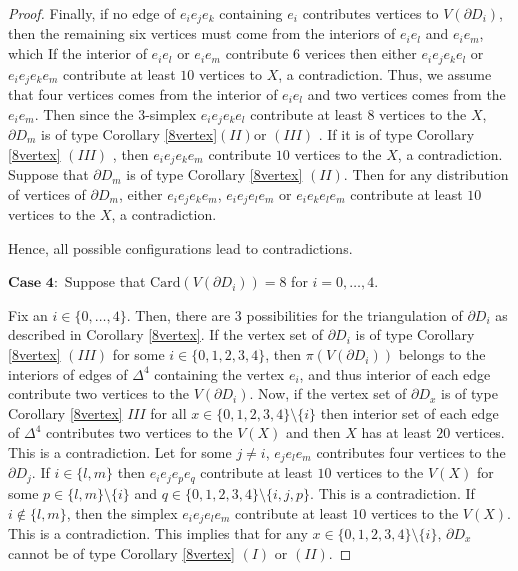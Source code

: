 \documentclass[10pt,a4paper]{amsart}
\newcommand{\D}{\Delta}
\begin{document}
\begin{proof}
Finally, if no edge of $e_i e_j e_k$ containing $e_i$ contributes vertices to $V(\partial D_i)$, then the remaining six vertices must come from the interiors of $e_i e_l$ and $e_i e_m$, which 
If the interior of $e_ie_l$ or $e_ie_m$ contribute $6$ verices then either $e_ie_je_ke_l$ or $e_ie_je_ke_m$ contribute at least $10$ vertices to $X$, a contradiction. Thus, we assume that four vertices comes from the interior of $e_ie_l$ and two vertices comes from the $e_ie_m$. Then since the $3$-simplex $e_ie_je_ke_l$ contribute at least  $8$ vertices to the $X$, $\partial D_m$ is of type Corollary \ref{8vertex}$(II)$or $(III)$ . If it is of type Corollary \ref{8vertex} $(III)$ , then $e_ie_je_ke_m$ contribute $10$ vertices to the $X$, a contradiction. Suppose that $\partial D_m$ is of type Corollary \ref{8vertex} $(II)$. Then for any distribution of vertices of $\partial D_m$, either $e_i{e_j}e_{k}e_{m}$, $e_{i}e_{j}e_{l}e_{m}$ or $e_{i}e_{k}e_{l}e_{m}$ contribute at least $10$ vertices to the $X$, a contradiction.

Hence, all possible configurations lead to contradictions.





$\textbf{Case 4}:$ Suppose that $\mathrm{Card}( V(\partial D_i)) = 8$  for $i=0, \ldots, 4$. 

Fix an $i \in \{0, \ldots, 4\}$. Then, there are $3$ possibilities for the triangulation of $\partial D_i$ as described in Corollary \ref{8vertex}. 
If the vertex set of $\partial D_i$ is of type Corollary \ref{8vertex} $(III)$ for some $i\in \{0,1,2,3,4\}$, then $\pi(V(\partial D_i))$ belongs to the interiors of edges of $\Delta^4$ containing the vertex $e_i$, and thus interior of each edge contribute two vertices to the $V(\partial D_i)$. Now, if the vertex set of $\partial D_x$ is of type Corollary \ref{8vertex} $III$ for all $x\in \{0,1,2,3,4\}\setminus \{i\}$
 then interior set  of each edge of $\D^4$ contributes two vertices to the $V(X)$ and then $X$ has at least $20$ vertices. This is a contradiction.
Let for some $j\neq i$, $e_je_le_m$  contributes four vertices to the $\partial D_j$. If $i\in \{l,m\}$ then $e_ie_je_pe_q$ contribute at least $10$ vertices to the $V(X)$ for some $p\in \{l,m\}\setminus \{i\}$ and $q\in \{0,1,2,3,4\}\setminus \{i,j,p\}$. This is a contradiction. If $i\notin\{l,m\}$, then the simplex $e_ie_je_le_m$ contribute at least $10$ vertices to the $V(X)$. This is a contradiction. This implies that for any $x\in \{0,1,2,3,4\}\setminus \{i\}$, $\partial D_x$ cannot be of type Corollary \ref{8vertex} $(I)$ or $(II)$.


\end{proof}
\end{document}
